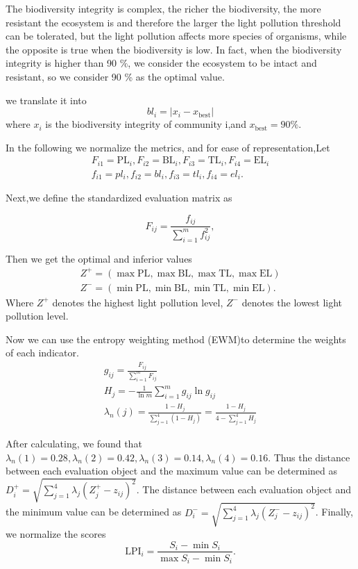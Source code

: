 \documentclass[12pt]{article}
\begin{document}
 The biodiversity integrity is complex, the richer the biodiversity, the more resistant the ecosystem is and therefore the larger the light pollution threshold can be tolerated, but the light pollution affects more species of organisms, while the opposite is true when the biodiversity is low. In fact, when the biodiversity integrity is higher than 90 $\%$, we consider the ecosystem to be intact and resistant, so we consider 90 \% as the optimal value.


we translate it into
$$bl_i=|x_i-x_{\text{best}}|$$where $x_i$ is the biodiversity integrity of community i,and $x_{\text{best}}=90\%$.

In the following we normalize the metrics, and for ease of representation,Let 
\begin{gather}
F_{i1}=\text{PL}_i , F_{i2}=\text{BL}_i , F_{i3}=\text{TL}_i , F_{i4}=\text{EL}_i \\
f_{i1}=pl_i , f_{i2}=bl_i , f_{i3}=tl_i , f_{i4}=el_i. 
\end{gather}

Next,we define the standardized evaluation matrix as

\begin{equation}F_{ij}=\frac{f_{ij}}{\sum_{i=1}^m f_{ij}^2},\end{equation}

Then we get the optimal and inferior values
\begin{gather}
Z^+=(\max{\text{PL}},\max{\text{BL}},\max{\text{TL}},\max{\text{EL}})\\
Z^-=(\min{\text{PL}},\min{\text{BL}},\min{\text{TL}},\min{\text{EL}}).
\end{gather}
Where $Z^+$ denotes the highest light pollution level, $Z^-$ denotes the lowest light pollution level.

Now we can use the entropy weighting method (EWM)to determine the weights of each indicator.
\begin{gather}
g_{ij}=\frac{F_{ij}}{\sum_{i=1}^{m} F_{ij}}\\
H_j=-\frac{1}{\ln m}\sum_{i=1}^m g_{ij}\ln g_{ij}\\
\lambda_n(j)=\frac{1-H_j}{\sum_{j=1}^4(1-H_j)}=\frac{1-H_j}{4-\sum_{j=1}^4 H_j}\end{gather}

After calculating, we found that $\lambda_n(1)=0.28,\lambda_n(2)=0.42,\lambda_n(3)=0.14,\lambda_n(4)=0.16$. Thus the distance between each evaluation object and the maximum value can be determined as 
$D^+_i=\sqrt{\sum_{j=1}^4 \lambda_j(Z^+_j-z_{ij} )^2}$.
The distance between each evaluation object and the minimum value can be determined as 
$D^-_i=\sqrt{\sum_{j=1}^4 \lambda_j(Z^-_j-z_{ij} )^2}$.
Finally, we normalize the scores\begin{equation}
\text{LPI}_i=\frac{S_i-\min S_i}{\max S_i-\min S_i}.\end{equation}
\end{document}
